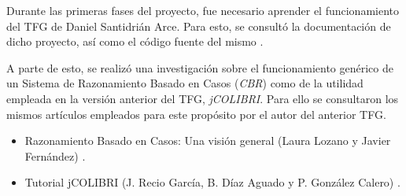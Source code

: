 Durante las primeras fases del proyecto, fue necesario aprender el funcionamiento del TFG de Daniel Santidrián Arce. Para esto, se consultó la documentación de dicho proyecto, así como el código fuente del mismo \cite{tfg:art}.

A parte de esto, se realizó una investigación sobre el funcionamiento genérico de un Sistema de Razonamiento Basado en Casos (\textit{CBR}) como de la utilidad empleada en la versión anterior del TFG, \textit{jCOLIBRI}. Para ello se consultaron los mismos artículos empleados para este propósito por el autor del anterior TFG.

\begin{itemize}
	\tightlist
	\item
	Razonamiento Basado en Casos: Una visión general (Laura Lozano y Javier Fernández) \cite{cbr:art}.
	\item 
	Tutorial jCOLIBRI (J. Recio García, B. Díaz Aguado y P. González Calero) \cite{colibri:tut}.
\end{itemize}
